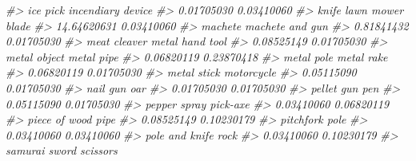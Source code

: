 \documentclass[
  12pt,
]{book}
\newenvironment{Shaded}{\begin{snugshade}}{\end{snugshade}}
\newcommand{\CommentTok}[1]{\textcolor[rgb]{0.37,0.37,0.37}{\textit{#1}}}
\begin{document}
\begin{Shaded}
\begin{Highlighting}[]
\CommentTok{\#\textgreater{}                         ice pick                incendiary device }
\CommentTok{\#\textgreater{}                       0.01705030                       0.03410060 }
\CommentTok{\#\textgreater{}                            knife                 lawn mower blade }
\CommentTok{\#\textgreater{}                      14.64620631                       0.03410060 }
\CommentTok{\#\textgreater{}                          machete                  machete and gun }
\CommentTok{\#\textgreater{}                       0.81841432                       0.01705030 }
\CommentTok{\#\textgreater{}                     meat cleaver                  metal hand tool }
\CommentTok{\#\textgreater{}                       0.08525149                       0.01705030 }
\CommentTok{\#\textgreater{}                     metal object                       metal pipe }
\CommentTok{\#\textgreater{}                       0.06820119                       0.23870418 }
\CommentTok{\#\textgreater{}                       metal pole                       metal rake }
\CommentTok{\#\textgreater{}                       0.06820119                       0.01705030 }
\CommentTok{\#\textgreater{}                      metal stick                       motorcycle }
\CommentTok{\#\textgreater{}                       0.05115090                       0.01705030 }
\CommentTok{\#\textgreater{}                         nail gun                              oar }
\CommentTok{\#\textgreater{}                       0.01705030                       0.01705030 }
\CommentTok{\#\textgreater{}                       pellet gun                              pen }
\CommentTok{\#\textgreater{}                       0.05115090                       0.01705030 }
\CommentTok{\#\textgreater{}                     pepper spray                         pick{-}axe }
\CommentTok{\#\textgreater{}                       0.03410060                       0.06820119 }
\CommentTok{\#\textgreater{}                    piece of wood                             pipe }
\CommentTok{\#\textgreater{}                       0.08525149                       0.10230179 }
\CommentTok{\#\textgreater{}                        pitchfork                             pole }
\CommentTok{\#\textgreater{}                       0.03410060                       0.03410060 }
\CommentTok{\#\textgreater{}                   pole and knife                             rock }
\CommentTok{\#\textgreater{}                       0.03410060                       0.10230179 }
\CommentTok{\#\textgreater{}                    samurai sword                         scissors }

\end{Highlighting}
\end{Shaded}
\end{document}

